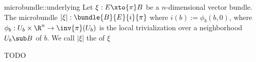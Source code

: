 \begin{myexample}{microbundle::underlying}{}
    Let $\xi: E \xto{\pi} B$ be a $n$-dimensional vector bundle.
    The microbundle $\lvert \xi \rvert: \bundle{B}{E}{i}{\pi}$ where $i(b) := \phi_b(b, 0)$, where
    $\phi_b: U_b \times \R^n \to \inv{\pi}(U_b)$ is the local trivialization over a
    neighborhood $U_b \sub B$ of $b$. We call $\lvert \xi \rvert$ the  of $\xi$
\end{myexample}

\begin{myproof}
    TODO
\end{myproof}